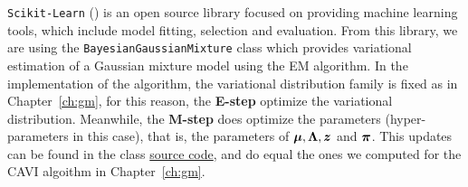 
\texttt{Scikit-Learn} (\cite{scikit-learn}) is an open source library focused on providing machine learning tools, which include model fitting, selection and evaluation. From this library, we are using the \texttt{BayesianGaussianMixture} class which provides variational estimation of a Gaussian mixture model using the EM algorithm.
In the implementation of the algorithm, the variational distribution family is fixed as in Chapter~\ref{ch:gm}, for this reason, the \textbf{E-step} optimize the variational distribution. Meanwhile, the \textbf{M-step} does optimize the parameters (hyper-parameters in this case), that is, the parameters of \(\bm{\mu}, \bm{\Lambda}, \bm{z}\) and \(\bm{\pi}\). This updates can be found in the class \href{https://github.com/scikit-learn/scikit-learn/blob/0fb307bf3/sklearn/mixture/_bayesian_mixture.py#L65}{source code}, and do equal the ones we computed for the CAVI algoithm in Chapter~\ref{ch:gm}.


